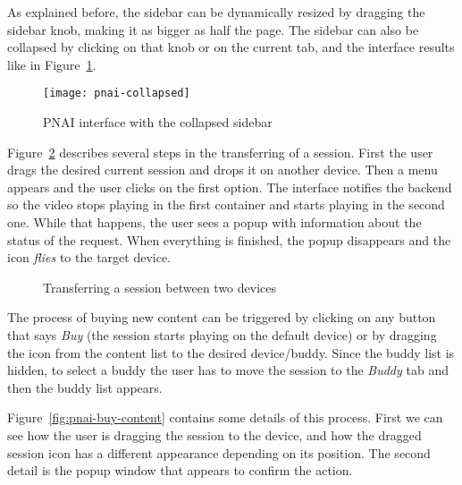 As explained before, the sidebar can be dynamically resized by dragging the sidebar knob, making it as bigger as half the page.
The sidebar can also be collapsed by clicking on that knob or on the current tab, and the interface results like in Figure~\ref{fig:pnai-collapsed}.

\begin{figure}[htbp]
  \centering
    \texttt{[image: pnai-collapsed]}
  \caption{PNAI interface with the collapsed sidebar}
  \label{fig:pnai-collapsed}
\end{figure}

Figure~\ref{fig:pnai-handover} describes several steps in the transferring of a session.
First the user drags the desired current session and drops it on another device.
Then a menu appears and the user clicks on the first option.
The interface notifies the backend so the video stops playing in the first container and starts playing in the second one.
While that happens, the user sees a popup with information about the status of the request.
When everything is finished, the popup disappears and the icon \emph{flies} to the target device.

\begin{figure}[htbp]
  \centering
  \caption{Transferring a session between two devices}
  \label{fig:pnai-handover}
\end{figure}

The process of buying new content can be triggered by clicking on any button that says \emph{Buy} (the session starts playing on the default device) or by dragging the icon from the content list to the desired device/buddy.
Since the buddy list is hidden, to select a buddy the user has to move the session to the \emph{Buddy} tab and then the buddy list appears.

Figure~\ref{fig:pnai-buy-content} contains some details of this process.
First we can see how the user is dragging the session to the device, and how the dragged session icon has a different appearance depending on its position.
The second detail is the popup window that appears to confirm the action.

